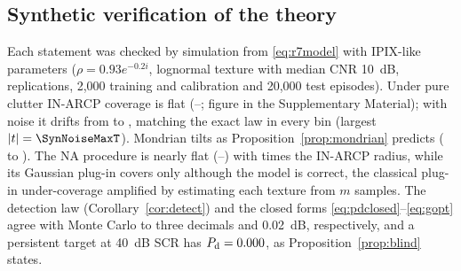 \documentclass[journal]{IEEEtran}
\begin{document}
\subsection{Synthetic verification of the theory}
Each statement was checked by simulation from \eqref{eq:r7model} with IPIX-like parameters ($\rho=0.93e^{-0.2i}$, lognormal texture with median CNR 10~dB, \SynReps{} replications, 2,000 training and calibration and 20,000 test episodes). Under pure clutter IN-ARCP coverage is flat (\SynSirvInLow{}--\SynSirvInHigh{}; figure in the Supplementary Material); with noise it drifts from \SynNoiseInLow{} to \SynNoiseInHigh{}, matching the exact law in every bin (largest $|t|=\SynNoiseMaxT$). Mondrian tilts as Proposition~\ref{prop:mondrian} predicts (\SynSirvMonLow{} to \SynSirvMonHigh{}). The NA procedure is nearly flat (\SynNaLow{}--\SynNaHigh{}) with \SynNaRatio{} times the IN-ARCP radius, while its Gaussian plug-in covers only \SynNaGCov{} although the model is correct, the classical plug-in under-coverage \cite{barndorff1996,vidoni2009,lawless2005} amplified by estimating each texture from $m$ samples. The detection law (Corollary~\ref{cor:detect}) and the closed forms \eqref{eq:pdclosed}--\eqref{eq:gopt} agree with Monte Carlo to three decimals and 0.02~dB, respectively, and a persistent target at 40~dB SCR has $P_{\rm d}=0.000$, as Proposition~\ref{prop:blind} states.
\end{document}

